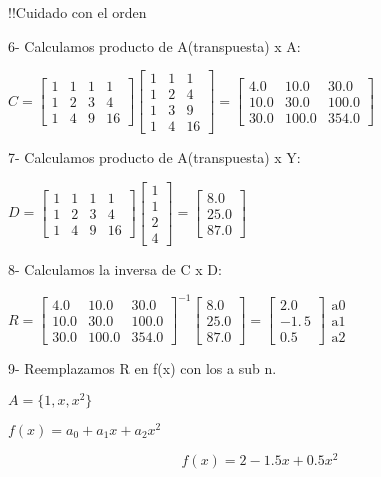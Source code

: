 \documentclass{article}
\begin{document}
\bigskip !!Cuidado con el orden

6- Calculamos producto de A(transpuesta) x A:

$C=\left[ 
\begin{array}{cccc}
1 & 1 & 1 & 1 \\ 
1 & 2 & 3 & 4 \\ 
1 & 4 & 9 & 16%
\end{array}%
\right] \left[ 
\begin{array}{ccc}
1 & 1 & 1 \\ 
1 & 2 & 4 \\ 
1 & 3 & 9 \\ 
1 & 4 & 16%
\end{array}%
\right] =\allowbreak \left[ 
\begin{array}{ccc}
4.0 & 10.0 & 30.0 \\ 
10.0 & 30.0 & 100.0 \\ 
30.0 & 100.0 & 354.0%
\end{array}%
\right] \allowbreak $

7- Calculamos producto de A(transpuesta) x Y:

$D=\left[ 
\begin{array}{cccc}
1 & 1 & 1 & 1 \\ 
1 & 2 & 3 & 4 \\ 
1 & 4 & 9 & 16%
\end{array}%
\right] \left[ 
\begin{array}{c}
1 \\ 
1 \\ 
2 \\ 
4%
\end{array}%
\right] =\allowbreak \left[ 
\begin{array}{c}
8.0 \\ 
25.0 \\ 
87.0%
\end{array}%
\right] $

8- Calculamos la inversa de C x D:

$R=\left[ 
\begin{array}{ccc}
4.0 & 10.0 & 30.0 \\ 
10.0 & 30.0 & 100.0 \\ 
30.0 & 100.0 & 354.0%
\end{array}%
\right] ^{-1}\left[ 
\begin{array}{c}
8.0 \\ 
25.0 \\ 
87.0%
\end{array}%
\right] =\allowbreak \left[ 
\begin{array}{c}
2.0 \\ 
-1.\,\allowbreak 5 \\ 
0.5%
\end{array}%
\right] 
\begin{array}{c}
\text{a0} \\ 
\text{a1} \\ 
\text{a2}%
\end{array}%
$

\bigskip

9- Reemplazamos R en f(x) con los a sub n.

$A=\{1,x,x^{2}\}$

$f(x)=a_{0}+a_{1}x+a_{2}x^{2}$

\[
f(x)=2-1.5x+0.5x^{2} 
\]
\end{document}
